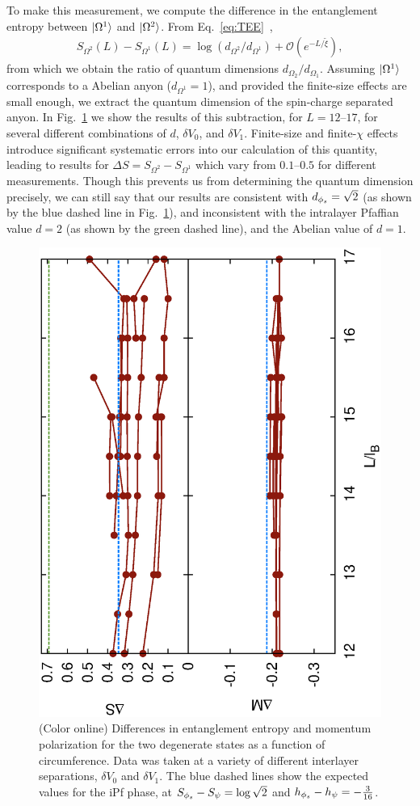 To make this measurement, we compute the difference in the entanglement entropy between $\ket{\Omega^1}$ and $\ket{\Omega^2}$.
From Eq.~\eqref{eq:TEE}~\cite{KitaevPreskill,LevinWen},
\begin{align}
	S_{\Omega^2}(L) - S_{\Omega^1}(L) = \log(d_{\Omega^2}/d_{\Omega^1}) + \mathcal{O}(e^{-L/\tilde{\xi}}),
\end{align}
from which we obtain the ratio of quantum dimensions $d_{\Omega_2}/d_{\Omega_1}$.
Assuming $\ket{\Omega^1}$ corresponds to a Abelian anyon ($d_{\Omega^1}=1$), and provided the finite-size effects are small enough, we extract the quantum dimension of the spin-charge separated anyon.
In Fig.~\ref{deltas} we show the results of this subtraction, for $L = 12\mbox{--}17$, for several different combinations of $d$, $\delta V_0$, and $\delta V_1$.
Finite-size and finite-$\chi$ effects introduce significant systematic errors into our calculation of this quantity, leading to results for $\Delta S = S_{\Omega^2} - S_{\Omega^1}$ which vary from $0.1\mbox{--}0.5$ for different measurements.
Though this prevents us from determining the quantum dimension precisely, we can still say that our results are consistent with $d_{{\phi_s}} = \sqrt{2}$ (as shown by the blue dashed line in Fig.~\ref{deltas}), and inconsistent with the intralayer Pfaffian value $d=2$ (as shown by the green dashed line), and the Abelian value of $d=1$. 

\begin{figure}%
	\includegraphics[angle=-90,width=0.6\linewidth]{figures/deltas.eps}
	\caption{(Color online)
		Differences in entanglement entropy and momentum polarization for the two degenerate states as a function of circumference.
		Data was taken at a variety of different interlayer separations, $\delta V_0$ and $\delta V_1$.
		The blue dashed lines show the expected values for the iPf phase, at $S_{\phi_s} - S_\psi = \log\sqrt{2}$ and $h_{\phi_s}-h_\psi = -\frac{3}{16}$.
	}
	\label{deltas}
\end{figure}


